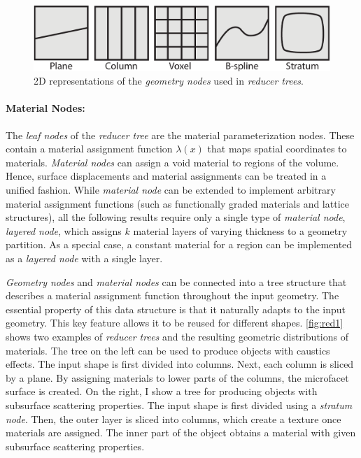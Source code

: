 \begin{figure}[h]
\centering
\includegraphics[width=0.7\linewidth]{figure/geometryNodes}
\caption{2D representations  of the \emph{geometry nodes} used in \emph{reducer trees}.}
\label{fig:geometryNodes}
\end{figure}

\paragraph{Material Nodes:} The \emph{leaf nodes} of the \emph{reducer tree} are the material parameterization nodes. These contain a material assignment function $\lambda\left(x\right)$ that maps spatial coordinates to materials. \emph{Material nodes} can assign a void material to regions of the volume. Hence, surface displacements and material assignments can be treated in a unified fashion.
While \emph{material node} can be extended to implement arbitrary material assignment functions
(such as functionally graded materials and lattice structures),
all the following results require only a single type of \emph{material node}, \emph{layered node}, which assigns $k$ material layers of varying thickness to a geometry partition.
As a special case, a constant material for a region can be implemented as a \emph{layered node} with a single layer.

\emph{Geometry nodes} and \emph{material nodes} can be connected into a tree structure that describes a material assignment function throughout the input geometry. 
The essential property of this data structure is that it naturally adapts to the input geometry. This key feature allows it to be reused for different shapes.
\autoref{fig:red1} shows two examples of \emph{reducer trees} and the resulting geometric distributions of materials.
The tree on the left can be used to produce objects with caustics effects.
The input shape is first divided into columns. Next, each column is sliced by a plane.
By assigning materials to lower parts of the columns, the microfacet surface is created.
On the right, I show a tree for producing objects with subsurface scattering properties.
The input shape is first divided using a \emph{stratum node}. Then, the outer layer is sliced into columns, which create a texture once materials are assigned. The inner part of the object obtains a material with given subsurface scattering properties.

